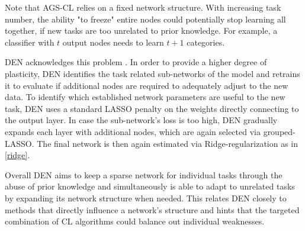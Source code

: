 Note that AGS-CL relies on a fixed network structure. With increasing task number, the ability "to freeze" entire nodes could potentially stop learning all together, if new tasks are too unrelated to prior knowledge. For example, a classifier with $t$ output nodes needs to learn $t+1$ categories. 

DEN acknowledges this problem \cite{yoon2018lifelonglearningdynamicallyexpandable}. In order to provide a higher degree of plasticity, DEN identifies the task related sub-networks of the model and retrains it to evaluate if additional nodes are required to adequately adjust to the new data. To identify which established network parameters are useful to the new task, DEN uses a standard LASSO penalty on the weights directly connecting to the output layer. In case the sub-network's loss is too high, DEN gradually expands each layer with additional nodes, which are again selected via grouped-LASSO. The final network is then again estimated via Ridge-regularization as in \eqref{ridge}. 

Overall DEN aims to keep a sparse network for individual tasks through the abuse of prior knowledge and simultaneously is able to adapt to unrelated tasks by expanding its network structure when needed. This relates DEN closely to methods that directly influence a network's structure and hints that the targeted combination of CL algorithms could balance out individual weaknesses. 

